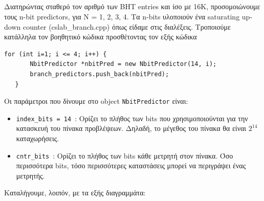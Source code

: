 \documentclass{article}
\begin{document}
\subsection{}
 Διατηρώντας σταθερό τον αριθμό των BHT entries και ίσο με 16Κ, προσομοιώνουμε τους n-bit
predictors, για Ν = 1, 2, 3, 4. Τα n-bits υλοποιούν ένα saturating up-down counter (cslab\_branch.cpp) όπως είδαμε στις διαλέξεις.
Τροποιούμε κατάλληλα τον βοηθητικό κώδικα προσθέτοντας τον εξής κώδικα
\begin{lstlisting}[style=cppstyle]
   for (int i=1; i <= 4; i++) {
       NbitPredictor *nbitPred = new NbitPredictor(14, i);
       branch_predictors.push_back(nbitPred);
   }
\end{lstlisting}
Οι παράμετροι που δίνουμε στο object \texttt{NbitPredictor} είναι:
\begin{itemize}
    \item \texttt{index\_bits = 14}~: Ορίζει το πλήθος των bits που χρησιμοποιούνται για την κατασκευή του πίνακα προβλέψεων. Δηλαδή, το μέγεθος του πίνακα θα είναι $2^{14}$ καταχωρήσεις.
    \item \texttt{cntr\_bits}~: Ορίζει το πλήθος των bits κάθε μετρητή στον πίνακα. Όσο περισσότερα bits, τόσο περισσότερες καταστάσεις μπορεί να περιγράψει ένας μετρητής.

\end{itemize}
\pagebreak
Καταλήγουμε, λοιπόν, με τα εξής διαγραμμάτα:
\end{document}
